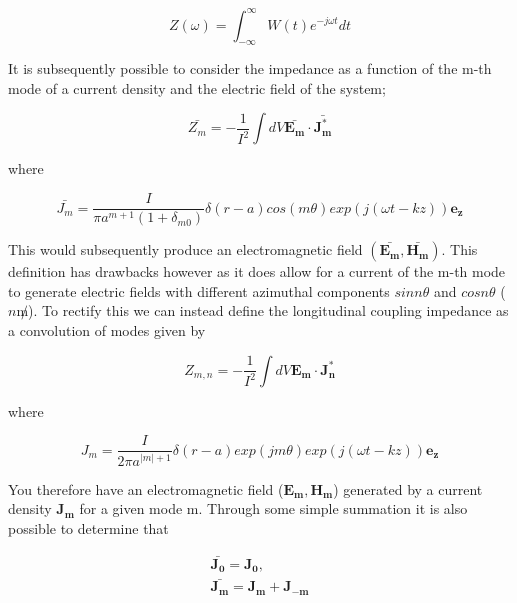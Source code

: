 \begin{equation}
Z(\omega) = \int^{\infty}_{-\infty} W(t) e^{-j\omega{}t} dt
\label{eqn:impedance-ft}
\end{equation}

It is subsequently possible to consider the impedance as a function of the m-th mode of a current density and the electric field of the system;

\begin{equation}
\bar{Z_{m}} = -\frac{1}{I^{2}} \int dV \mathbf{\bar{E_{m}}}\cdot\mathbf{\bar{J^{*}_{m}}}
\label{eqn:imp-modal}
\end{equation}

where

\begin{equation}
\bar{J_{m}} = \frac{I}{\pi{}a^{m+1}(1+\delta_{m0})} \delta{}(r-a)cos(m\theta)exp(j(\omega{}t-kz))\mathbf{e_{z}}
\label{eqn:j-def}
\end{equation}

This would subsequently produce an electromagnetic field $(\mathbf{\bar{E_{m}}}, \mathbf{\bar{H_{m}}})$. This definition has drawbacks however as it does allow for a current of the m-th mode to generate electric fields with different azimuthal components $sinn\theta$ and $cosn\theta$ ($n \not m$). To rectify this we can instead define the longitudinal coupling impedance as a convolution of modes given by

\begin{equation}
{Z_{m, n}} = -\frac{1}{I^{2}} \int dV \mathbf{E_{m}}\cdot\mathbf{J^{*}_{n}}
\label{eqn:imp-modal-coupled}
\end{equation}

where 

\begin{equation}
{J_{m}} = \frac{I}{2\pi{}a^{|m|+1}} \delta{}(r-a)exp(jm\theta)exp(j(\omega{}t-kz))\mathbf{e_{z}}
\label{eqn:j-def}
\end{equation}

You therefore have an electromagnetic field ($\mathbf{E_{m}}, \mathbf{H_{m}}$) generated by a current density $\mathbf{J_{m}}$ for a given mode m. Through some simple summation it is also possible to determine that

\begin{eqnarray}
\mathbf{\bar{J_{0}}} = \mathbf{J_{0}}, \\
\mathbf{\bar{J_{m}}} = \mathbf{J_{m} + J_{-m}}
\label{eqn:m-compare}
\end{eqnarray}

